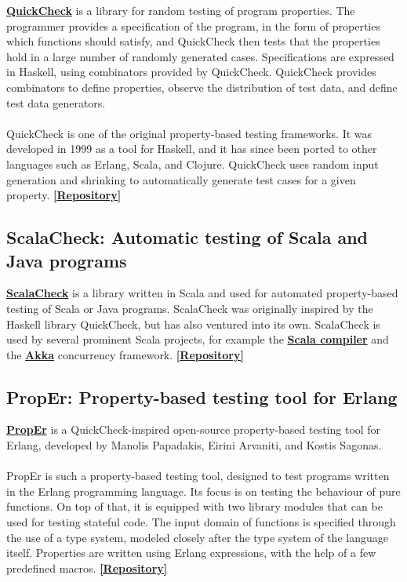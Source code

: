 \documentclass{report}
\newcommand{\bhref}[2]{\textbf{\href{#1}{#2}}}
\newcommand{\repo}[1]{\bhref{#1}{[Repository]}}
\begin{document}
\bhref{https://hackage.haskell.org/package/QuickCheck}{QuickCheck} is a library for random testing of program properties. The programmer provides a specification of the program, in the form of properties which functions should satisfy, and QuickCheck then tests that the properties hold in a large number of randomly generated cases. Specifications are expressed in Haskell, using combinators provided by QuickCheck. QuickCheck provides combinators to define properties, observe the distribution of test data, and define test data generators. \\\\
 QuickCheck is one of the original property-based testing frameworks. It was developed in 1999 as a tool for Haskell, and it has since been ported to other languages such as Erlang, Scala, and Clojure. QuickCheck uses random input generation and shrinking to automatically generate test cases for a given property.
\repo{https://github.com/nick8325/quickcheck}

\subsection{ScalaCheck: Automatic testing of Scala and Java programs}

\bhref{https://scalacheck.org/index.html}{ScalaCheck} is a library written in Scala and used for automated property-based testing of Scala or Java programs. ScalaCheck was originally inspired by the Haskell library QuickCheck, but has also ventured into its own. ScalaCheck is used by several prominent Scala projects, for example the \bhref{https://www.scala-lang.org/}{Scala compiler} and the \bhref{https://akka.io/}{Akka} concurrency framework. \repo{https://github.com/typelevel/scalacheck}

\subsection{PropEr: Property-based testing tool for Erlang}

\bhref{https://proper-testing.github.io/}{PropEr} is a QuickCheck-inspired open-source property-based testing tool for Erlang, developed by Manolis Papadakis, Eirini Arvaniti, and Kostis Sagonas.\\\\
PropEr is such a property-based testing tool, designed to test programs written in the Erlang programming language. Its focus is on testing the behaviour of pure functions. On top of that, it is equipped with two library modules that can be used for testing stateful code. The input domain of functions is specified through the use of a type system, modeled closely after the type system of the language itself. Properties are written using Erlang expressions, with the help of a few predefined macros. \repo{https://github.com/proper-testing/proper}
\end{document}
